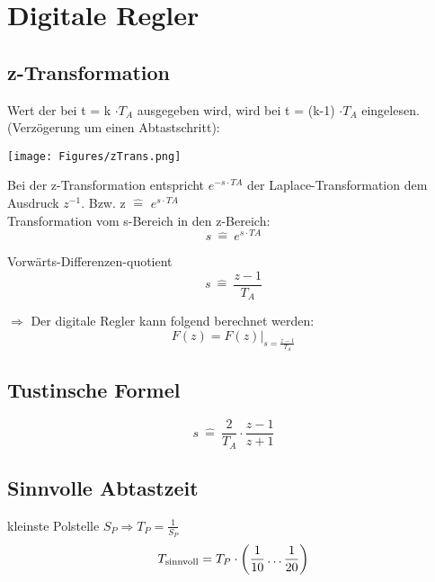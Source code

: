 \section{Digitale Regler}
\subsection{z-Transformation}

Wert der bei t = k $\cdot T_A$ ausgegeben wird, wird bei t = (k-1) $\cdot T_A$
eingelesen. (Verzögerung um einen Abtastschritt):

\texttt{[image: Figures/zTrans.png]}

Bei der z-Transformation entspricht $e^{-s \cdot TA}$ der
Laplace-Transformation dem Ausdruck $z^{-1}$. Bzw. z $\hat{=}$ $e^{s \cdot
			TA}$\\ Transformation vom s-Bereich in den z-Bereich:
\[
	s \ \hat{=}\  e^{s \cdot TA}
\]

Vorwärts-Differenzen-quotient
\[
	s \ \hat{=} \ \frac{z-1}{T_A}
\]

$\Rightarrow$ Der digitale Regler kann folgend berechnet werden:
\[
	F(z) = F(z)|_{s= \frac {z-1}{T_A}}
\]

\subsection{Tustinsche Formel}
\[
	s \ \hat{=} \ \frac{2}{T_A} \cdot \frac{z-1}{z+1}
\]

\subsection{Sinnvolle Abtastzeit}
kleinste Polstelle $S_P \Rightarrow T_P = \frac{1}{S_P}$
\[
	T_{\textnormal{sinnvoll}} = T_P \cdot \left(\frac{1}{10} \dots \frac{1}{20}\right)
\]